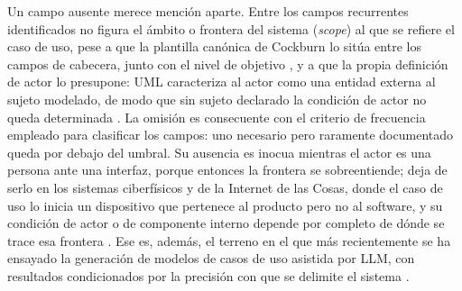 


    Un campo ausente merece mención aparte. Entre los campos recurrentes identificados no figura el ámbito o frontera del sistema (\emph{scope}) al que se refiere el caso de uso, pese a que la plantilla canónica de Cockburn lo sitúa entre los campos de cabecera, junto con el nivel de objetivo \cite{cockburn2001usecases}, y a que la propia definición de actor lo presupone: UML caracteriza al actor como una entidad externa al sujeto modelado, de modo que sin sujeto declarado la condición de actor no queda determinada \cite{omg2017uml,larman2004uml}. La omisión es consecuente con el criterio de frecuencia empleado para clasificar los campos: uno necesario pero raramente documentado queda por debajo del umbral. Su ausencia es inocua mientras el actor es una persona ante una interfaz, porque entonces la frontera se sobreentiende; deja de serlo en los sistemas ciberfísicos y de la Internet de las Cosas, donde el caso de uso lo inicia un dispositivo que pertenece al producto pero no al software, y su condición de actor o de componente interno depende por completo de dónde se trace esa frontera \cite{daun2023context,boutot2024ucm4iot}. Ese es, además, el terreno en el que más recientemente se ha ensayado la generación de modelos de casos de uso asistida por LLM, con resultados condicionados por la precisión con que se delimite el sistema \cite{tabassum2024llmusecase}.


